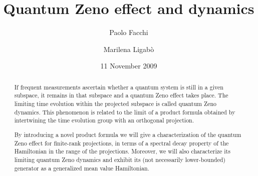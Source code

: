 \documentclass[aip,jmp,12pt
]{revtex4}
\theoremstyle{definition}
\begin{document}

\title{Quantum Zeno effect and dynamics} %



\author{Paolo Facchi}


\author{Marilena Ligab\`o}


\date{11 November 2009}

\begin{abstract}
If frequent measurements ascertain whether a quantum system is still in a given subspace, it remains in that subspace and a quantum Zeno effect takes place. The limiting time evolution within the projected subspace is called quantum Zeno dynamics. This phenomenon is related to the limit of a product formula obtained by intertwining the time evolution group with an orthogonal projection.

By introducing a novel product formula we will give a characterization of the  quantum Zeno effect for finite-rank projections, in terms of a spectral decay property of the  Hamiltonian in the range of the projections.
Moreover, we will also characterize its limiting quantum Zeno dynamics and exhibit its (not necessarily lower-bounded) generator as a generalized mean value Hamiltonian.
\end{abstract}
\end{document}
